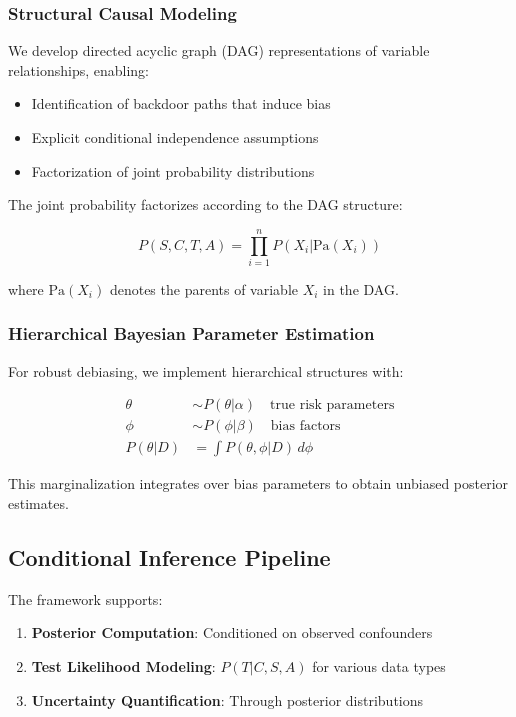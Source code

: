 \documentclass[11pt,a4paper]{article}
\theoremstyle{plain}
\theoremstyle{definition}
\theoremstyle{remark}
\begin{document}
\subsubsection{Structural Causal Modeling}

We develop directed acyclic graph (DAG) representations of variable relationships, enabling:

\begin{itemize}
    \item Identification of backdoor paths that induce bias
    \item Explicit conditional independence assumptions
    \item Factorization of joint probability distributions
\end{itemize}

The joint probability factorizes according to the DAG structure:

\begin{equation}
P(S, C, T, A) = \prod_{i=1}^{n} P(X_i | \text{Pa}(X_i))
\end{equation}

where $\text{Pa}(X_i)$ denotes the parents of variable $X_i$ in the DAG.

\subsubsection{Hierarchical Bayesian Parameter Estimation}

For robust debiasing, we implement hierarchical structures with:

\begin{align}
\theta &\sim P(\theta | \alpha) \quad \text{true risk parameters}\\
\phi &\sim P(\phi | \beta) \quad \text{bias factors}\\
P(\theta|D) &= \int P(\theta, \phi|D) \, d\phi
\end{align}

This marginalization integrates over bias parameters to obtain unbiased posterior estimates.

\subsection{Conditional Inference Pipeline}

The framework supports:

\begin{enumerate}
    \item \textbf{Posterior Computation}: Conditioned on observed confounders
    \item \textbf{Test Likelihood Modeling}: $P(T|C, S, A)$ for various data types
    \item \textbf{Uncertainty Quantification}: Through posterior distributions
\end{enumerate}
\end{document}
